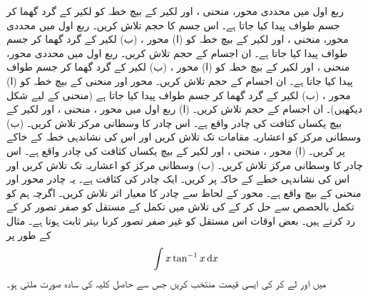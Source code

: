 ربع اول میں محددی محور، منحنی ،  اور لکیر  کے بیچ خطہ کو لکیر  کے گرد گھما کر جسم طواف پیدا کیا جاتا ہے۔ اس جسم کا حجم تلاش کریں۔
ربع اول میں محددی محور، منحنی ،  اور لکیر  کے بیچ خطہ کو (ا) محور   ، (ب) لکیر  کے گرد گھما کر جسم طواف پیدا کیا جاتا ہے۔ ان اجسام کے حجم تلاش کریں۔
ربع اول میں محددی محور، منحنی ،  اور لکیر  کے بیچ خطہ کو (ا) محور   ، (ب) لکیر  کے گرد گھما کر جسم طواف پیدا کیا جاتا ہے۔ ان اجسام کے حجم تلاش کریں۔
محور  اور منحنی   کے بیچ خطہ کو (ا) محور   ، (ب) لکیر  کے گرد گھما کر جسم طواف پیدا کیا جاتا ہے (منحنی کے لیے شکل  دیکھیں)۔ ان اجسام کے حجم تلاش کریں۔
(ا) ربع اول میں محور ، منحنی ،  اور لکیر  کے بیچ یکساں کثافت کی چادر  واقع ہے۔ اس چادر کا وسطانی مرکز تلاش کریں۔ (ب) وسطانی مرکز کو  اعشاریہ مقامات  تک تلاش کریں اور اس کی نشاندہی خطہ کے خاکے  پر کریں۔
(ا) محور ، منحنی  ، اور لکیر  کے بیچ یکساں کثافت کی چادر   واقع ہے۔ اس چادر کا وسطانی مرکز تلاش کریں۔ (ب) وسطانی مرکز کو  اعشاریہ تک تلاش کریں اور اس کی نشاندہی خطے کے خاکہ پر کریں۔
ایک چادر کی کثافت  ہے۔ یہ چادر محور  اور منحنی  کے بیچ  واقع  ہے۔ محور  کے لحاظ سے   چادر کا معیار اثر تلاش کریں۔
اگرچہ ہم  کو تکمل بالحصص سے حل کر کے  کی تلاش میں تکمل کے مستقل کو صفر تصور کر کے رد کرتے ہیں۔ بعض اوقات اس مستقل کو غیر صفر تصور کرنا بہتر ثابت ہوتا ہے۔ مثال کے طور پر
\begin{align*}
\int x\tan^{-1}x\dif x
\end{align*}
میں  اور  لے کر  کی ایسی قیمت منتخب کریں جس سے حاصل کلیہ کی سادہ صورت ملتی ہو۔
